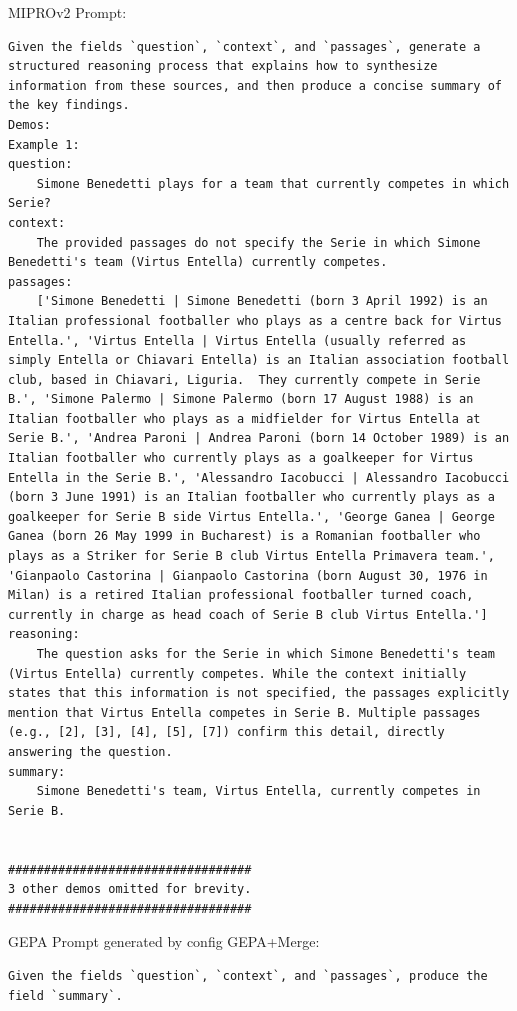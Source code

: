 \begin{instructbox}
MIPROv2 Prompt:
\begin{lstlisting}[breakindent=0pt, breaklines=true, breakatwhitespace=true, frame=single, backgroundcolor=\color{green!10}]
Given the fields `question`, `context`, and `passages`, generate a structured reasoning process that explains how to synthesize information from these sources, and then produce a concise summary of the key findings.
Demos:
Example 1:
question:
    Simone Benedetti plays for a team that currently competes in which Serie?
context:
    The provided passages do not specify the Serie in which Simone Benedetti's team (Virtus Entella) currently competes.
passages:
    ['Simone Benedetti | Simone Benedetti (born 3 April 1992) is an Italian professional footballer who plays as a centre back for Virtus Entella.', 'Virtus Entella | Virtus Entella (usually referred as simply Entella or Chiavari Entella) is an Italian association football club, based in Chiavari, Liguria.  They currently compete in Serie B.', 'Simone Palermo | Simone Palermo (born 17 August 1988) is an Italian footballer who plays as a midfielder for Virtus Entella at Serie B.', 'Andrea Paroni | Andrea Paroni (born 14 October 1989) is an Italian footballer who currently plays as a goalkeeper for Virtus Entella in the Serie B.', 'Alessandro Iacobucci | Alessandro Iacobucci (born 3 June 1991) is an Italian footballer who currently plays as a goalkeeper for Serie B side Virtus Entella.', 'George Ganea | George Ganea (born 26 May 1999 in Bucharest) is a Romanian footballer who plays as a Striker for Serie B club Virtus Entella Primavera team.', 'Gianpaolo Castorina | Gianpaolo Castorina (born August 30, 1976 in Milan) is a retired Italian professional footballer turned coach, currently in charge as head coach of Serie B club Virtus Entella.']
reasoning:
    The question asks for the Serie in which Simone Benedetti's team (Virtus Entella) currently competes. While the context initially states that this information is not specified, the passages explicitly mention that Virtus Entella competes in Serie B. Multiple passages (e.g., [2], [3], [4], [5], [7]) confirm this detail, directly answering the question.
summary:
    Simone Benedetti's team, Virtus Entella, currently competes in Serie B.


##################################
3 other demos omitted for brevity.
##################################

\end{lstlisting}

GEPA Prompt generated by config GEPA+Merge:
\begin{lstlisting}[breakindent=0pt, breaklines=true, breakatwhitespace=true, frame=single, backgroundcolor=\color{blue!10}]
Given the fields `question`, `context`, and `passages`, produce the field `summary`.  


\end{lstlisting}
\end{instructbox}
